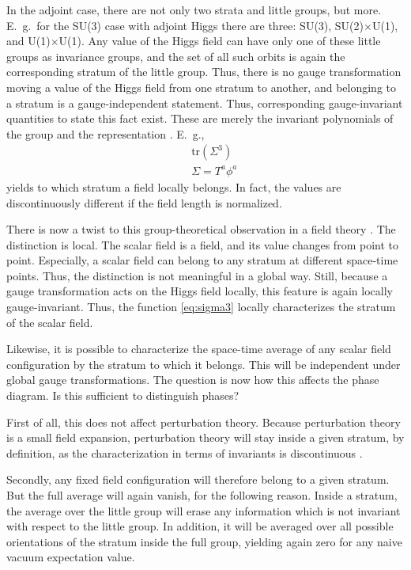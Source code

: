 \documentclass[final,twoside,12pt]{article}
\newcommand*{\no}{\noindent}
\newcommand*{\bea}{\begin{eqnarray}}
\newcommand*{\eea}{\end{eqnarray}}
\newcommand*{\nn}{\nonumber}
\newcommand*{\tr}{\mathrm{tr}}
\newcommand*{\1}{1\!\!\!\bot}
\begin{document}
In the adjoint case, there are not only two strata and little groups, but more. E.\ g.\ for the SU(3) case with adjoint Higgs there are three: SU(3), SU(2)$\times$U(1), and U(1)$\times$U(1). Any value of the Higgs field can have only one of these little groups as invariance groups, and the set of all such orbits is again the corresponding stratum of the little group. Thus, there is no gauge transformation moving a value of the Higgs field from one stratum to another, and belonging to a stratum is a gauge-independent statement. Thus, corresponding gauge-invariant quantities to state this fact exist. These are merely the invariant polynomials of the group and the representation \cite{O'Raifeartaigh:1986vq}. E.\ g., 
\bea
&&\tr\left(\Sigma^{3}\right)\label{eq:sigma3}\\
&&\Sigma=T^a\phi^a\nn
\eea
\no yields to which stratum a field locally belongs. In fact, the values are discontinuously different if the field length is normalized.

There is now a twist to this group-theoretical observation in a field theory \cite{Maas:2017xzh}. The distinction is local. The scalar field is a field, and its value changes from point to point. Especially, a scalar field can belong to any stratum at different space-time points. Thus, the distinction is not meaningful in a global way. Still, because a gauge transformation acts on the Higgs field locally, this feature is again locally gauge-invariant. Thus, the function \eqref{eq:sigma3} locally characterizes the stratum of the scalar field.

Likewise, it is possible to characterize the space-time average of any scalar field configuration by the stratum to which it belongs. This will be independent under global gauge transformations. The question is now how this affects the phase diagram. Is this sufficient to distinguish phases?

First of all, this does not affect perturbation theory. Because perturbation theory is a small field expansion, perturbation theory will stay inside a given stratum, by definition, as the characterization in terms of invariants is discontinuous \cite{O'Raifeartaigh:1986vq}.

Secondly, any fixed field configuration will therefore belong to a given stratum. But the full average will again vanish, for the following reason. Inside a stratum, the average over the little group will erase any information which is not invariant with respect to the little group. In addition, it will be averaged over all possible orientations of the stratum inside the full group, yielding again zero for any naive vacuum expectation value. 
\end{document}
